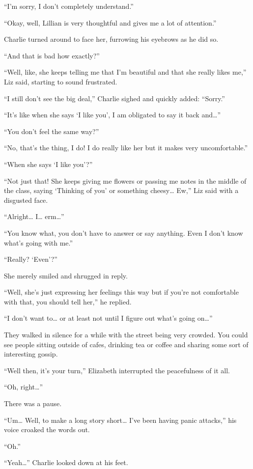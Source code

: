 “I’m sorry, I don’t completely understand.”

“Okay, well, Lillian is very thoughtful and gives me a lot of attention.”

Charlie turned around to face her, furrowing his eyebrows as he did so.

“And that is bad how exactly?”

“Well, like, she keeps telling me that I’m beautiful and that she really likes me,” Liz said, starting to sound frustrated.

“I still don’t see the big deal,” Charlie sighed and quickly added: “Sorry.”

“It’s like when she says ‘I like you’, I am obligated to say it back and…”

“You don’t feel the same way?”

“No, that’s the thing, I do! I do really like her but it makes very uncomfortable.”

“When she says ‘I like you’?”

“Not just that! She keeps giving me flowers or passing me notes in the middle of the class, saying ‘Thinking of you’ or something cheesy… Ew,” Liz said with a disgusted face.

“Alright… I… erm…”

“You know what, you don’t have to answer or say anything. Even I don’t know what’s going with me.”

“Really? ‘Even’?”

She merely smiled and shrugged in reply.

“Well, she’s just expressing her feelings this way but if you’re not comfortable with that, you should tell her,” he replied.

“I don’t want to… or at least not until I figure out what’s going on…”

They walked in silence for a while with the street being very crowded. You could see people sitting outside of cafes, drinking tea or coffee and sharing some sort of interesting gossip.

“Well then, it’s your turn,” Elizabeth interrupted the peacefulness of it all.

“Oh, right…”

There was a pause.

“Um… Well, to make a long story short… I’ve been having panic attacks,” his voice croaked the words out.

“Oh.”

“Yeah…” Charlie looked down at his feet.

